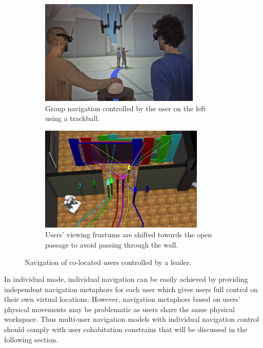 \begin{figure}[htb]
  \begin{subfigure}{.5\textwidth}
    \centering
    \includegraphics[height=5cm]{figures/ch2/group_navig_1}
    \caption{Group navigation controlled by the user on the left using a trackball.}
    \label{fig:2_group_navig:group_navig_1}
  \end{subfigure}
  \begin{subfigure}{.5\textwidth}
    \centering
    \includegraphics[height=5cm]{figures/ch2/group_navig_2}
    \caption{Users' viewing frustums are shifted towards the open passage to avoid passing through the wall.}
    \label{fig:2_group_navig:group_navig_2}
  \end{subfigure}
  \caption{\label{fig:2_group_navig}Navigation of co-located users controlled by a leader.}
\end{figure}

In individual mode, individual navigation can be easily achieved by providing independent navigation metaphors for each user which gives users full control on their own virtual locations. However, navigation metaphors based on users' physical movements may be problematic as users share the same physical workspace. Thus multi-user navigation models with individual navigation control should comply with user cohabitation constrains that will be discussed in the following section.



